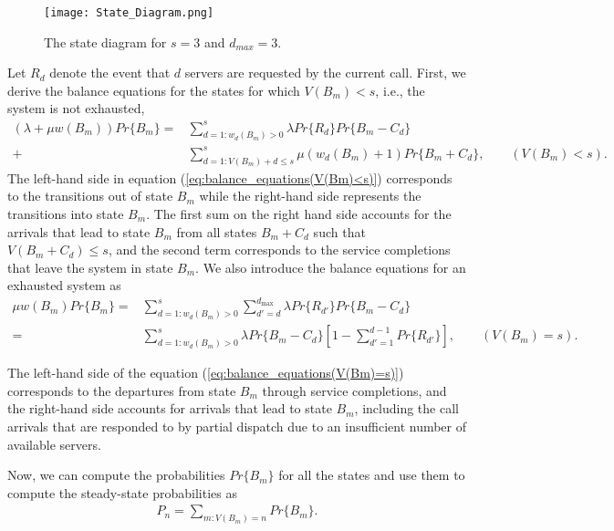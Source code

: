 \documentclass[11pt]{article}\topmargin 0mm
\begin{document}
\begin{figure}
	\centering
	\texttt{[image: State\_Diagram.png]}
	\caption{The state diagram for $s=3$ and $d_{max}=3$. \label{fig:state_diagram}}
\end{figure}

Let $R_d$ denote the event that $d$ servers are requested by
the current call. First, we derive the balance equations for
the states for which $V(B_m)<s$, i.e., the system is not
exhausted,
\begin{equation}
\label{eq:balance_equations(V(Bm)<s)}
\begin{split}
(\lambda + \mu w(B_m)) Pr\{B_m\} = & \sum_{d=1:w_d(B_m)>0}^s \lambda Pr\{R_d\}Pr\{B_m-C_d\} \\
+ & \sum_{d=1:V(B_m)+d\leq s}^s \mu (w_d(B_m)+1)Pr\{B_m+C_d\}, \qquad (V(B_m)<s).
\end{split}
\end{equation}
The left-hand side in equation (\ref{eq:balance_equations(V(Bm)<s)}) corresponds to the
transitions out of state $B_m$ while the right-hand side
represents the transitions into state $B_m$. The first sum on
the right hand side accounts for the arrivals that lead to
state $B_m$ from all states $B_m+C_d$ such that $V(B_m+C_d)\leq s$, and the second term corresponds to the service
completions that leave the system in state $B_m$. We also
introduce the balance equations for an exhausted system as
\begin{equation}
\label{eq:balance_equations(V(Bm)=s)}
\begin{split}
\mu w(B_m) Pr\{B_m\} = & \sum_{d=1:w_d(B_m)>0}^s \sum_{d'=d}^{d_{\max}} \lambda Pr\{R_{d'}\}Pr\{B_m-C_d\} \\
= & \sum_{d=1:w_d(B_m)>0}^s \lambda Pr\{B_m-C_d\} [1-\sum_{d'=1}^{d-1} Pr\{R_{d'}\}], \qquad (V(B_m)=s).
\end{split}
\end{equation}

The left-hand side of the equation (\ref{eq:balance_equations(V(Bm)=s)}) corresponds to the
departures from state $B_m$ through service completions, and
the right-hand side accounts for arrivals that lead to state
$B_m$, including the call arrivals that are responded to by partial
dispatch due to an insufficient number of available servers.

Now, we can compute the probabilities $Pr\{B_m\}$
for all the states and use them to compute the steady-state
probabilities as
\begin{equation}
\label{eq:steady_state_probes}
\begin{split}
P_n = \sum_{m:V(B_m)=n} Pr\{B_m\}.
\end{split}
\end{equation}
\end{document}
